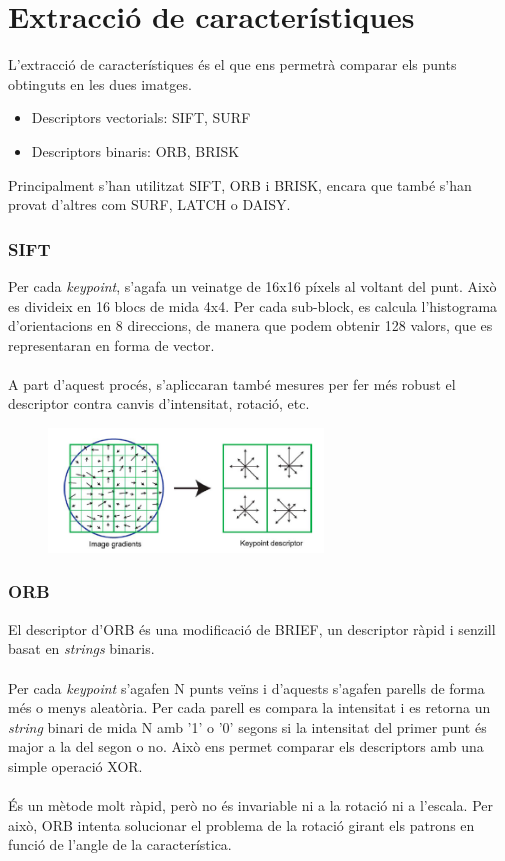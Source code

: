 \section{Extracció de característiques}

	L'extracció de característiques és el que ens permetrà comparar els punts obtinguts en les dues imatges.\\
	\begin{itemize}
		\item{Descriptors vectorials: SIFT, SURF}
		\item{Descriptors binaris: ORB, BRISK\\}
	\end{itemize}
	Principalment s'han utilitzat SIFT, ORB i BRISK, encara que també s'han provat d'altres com SURF, LATCH o DAISY\cite{Tola10}.

	\subsubsection{SIFT}
	Per cada \textit{keypoint}, s'agafa un veinatge de 16x16 píxels al voltant del punt. Això es divideix en 16 blocs de mida 4x4. Per cada sub-block,
	es calcula l'histograma d'orientacions en 8 direccions, de manera que podem obtenir 128 valors, que es representaran en forma de vector.\\\\
	A part d'aquest procés, s'apliccaran també mesures per fer més robust el descriptor contra canvis d'intensitat, rotació, etc.
	\begin{figure}[H]
		\centering
		\includegraphics[width=0.65\textwidth]{images/sift-des}
	\end{figure}

	\subsubsection{ORB}
	El descriptor d'ORB és una modificació de BRIEF\cite{Calonder:2010:BBR:1888089.1888148}, un descriptor ràpid i senzill basat en \textit{strings} binaris.\\\\
	Per cada \textit{keypoint} s'agafen N punts veïns i d'aquests s'agafen parells de forma més o menys aleatòria. Per cada parell es compara la intensitat i es retorna un \textit{string} binari de mida N amb '1' o '0' segons
	si la intensitat del primer punt és major a la del segon o no. Això ens permet comparar els descriptors amb una simple operació XOR.\\\\
	És un mètode molt ràpid, però no és invariable ni a la rotació ni a l'escala. Per això, ORB intenta solucionar el problema de la rotació girant els patrons en funció de l'angle de la característica.

